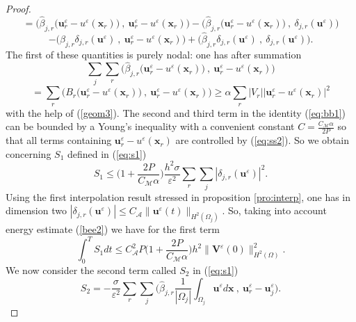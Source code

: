\documentclass[a4paper,french,english,10pt]{article}
\newcommand\uu{\mathbf{u}}
\newcommand\eps{\varepsilon}
\newcommand\x{\mathbf{x}}
\begin{document}
\begin{proof}
$$$$
$$
=\bigg( \widehat{\beta}_{j,r}\bigg(
\textbf{u}_r^{\eps}- u^\eps(\x_r)
\bigg ) 
\: , \: \textbf{u}_r^{\eps}-u^\eps(\x_r)
 \bigg)
-
\bigg( \widehat{\beta}_{j,r}\bigg(
\textbf{u}_r^{\eps}- u^\eps(\x_r)
\bigg ) 
\: , \: \delta_{j,r}(\textbf{u}^{\eps})
 \bigg)
$$
\begin{equation} \label{eq:bb1}
-
\bigg( 
\widehat{\beta}_{j,r} \delta_{j,r}(\textbf{u}^{\eps})
\: , \:
\textbf{u}_r^{\eps}- u^\eps(\x_r)
 \bigg)
+
\bigg( 
\widehat{\beta}_{j,r} \delta_{j,r}(\textbf{u}^{\eps})
\: , \:
 \delta_{j,r}(\textbf{u}^{\eps})
 \bigg).
\end{equation}
The first of these quantities is purely nodal: one has after summation 
$$
\sum_j \sum_r \bigg( \widehat{\beta}_{j,r}\bigg(
\textbf{u}_r^{\eps}- u^\eps(\x_r)
\bigg ) 
\: , \: \textbf{u}_r^{\eps}-u^\eps(\x_r)
 \bigg)
$$
\begin{equation} \label{eq:ss2}
=
 \sum_r \bigg( B_{r}\bigg(
\textbf{u}_r^{\eps}- u^\eps(\x_r)
\bigg ) 
\: , \: \textbf{u}_r^{\eps}-u^\eps(\x_r)
 \bigg)\geq \alpha \sum_r |V_r| | 
 \textbf{u}_r^{\eps}-
 u^\eps(\x_r) |^2
\end{equation}
with the help of (\ref{geom3}). The second and third term in the identity (\ref{eq:bb1}) can be bounded
by a Young's inequality with a convenient constant $C=\frac{C_\mathcal M \alpha}{2P}$
so that all terms containing $ \textbf{u}_r^{\eps}-u^\eps(\x_r)$
are controlled by (\ref{eq:ss2}).
So we obtain concerning $S_1$ defined in (\ref{eq:s1})
\begin{equation*} \label{eq:ss4}
S_1
\leq  \bigg( 1 + \frac{2 P}{C_\mathcal M\alpha} \bigg) \frac{h^2\sigma }{\eps^2}\sum_r \sum_j  \left|  \delta_{j,r}(\textbf{u}^{\eps}) \right|^2.
\end{equation*}
Using the first  interpolation result stressed in proposition \ref{pro:interp},
one has in dimension two
$| \delta_{j,r}(\textbf{u}^{\eps}) |
 \leq C_{\mathcal A}  \|\uu^\eps(t)\|_{H^2(\Omega_j)} $. 
So, taking into account energy estimate (\ref{bee2})
we have for the first term
\begin{equation*} \label{eq:ss6}
\int_0^T S_1dt \leq  C_{\mathcal A} ^2P  \bigg( 1 + \frac{2P}{C_\mathcal M\alpha} \bigg) h^2   \| \mathbf{V}^{\eps}(0) \|_{H^2(\Omega)}^2 .
\end{equation*}
We now consider the second term called  $S_2$ in (\ref{eq:s1})
\begin{equation*} \label{eq:ss5}
S_2=-\frac{\sigma}{\eps^2} \sum_r \sum_j  \bigg( \widehat{\beta}_{j,r}
\frac{1}{|\Omega_j|}\int_{\Omega_j} \uu^{\eps} d\x  \: , \:
\textbf{u}_r^{\eps}-\textbf{u}_j^{\eps} \bigg) .

\end{equation*}
\end{proof}
\end{document}
